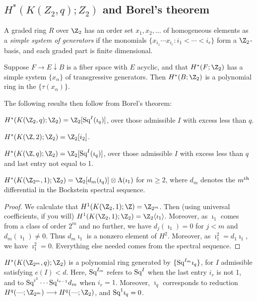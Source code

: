 \documentclass[11pt]{article}
\begin{document}
{\subsection{\texorpdfstring{$H^*(K(Z_2,q);Z_2)$}{H*(K(Z/2,q);Z/2)} and Borel's theorem}
A graded ring $R$ over $\Z_2$ has an order set $x_1,x_2,\ldots$ of homogeneous elements as a \emph{simple system of generators} if the monomials $\{x_{i_1}\cdots x_{i_r}:i_1<\cdots<i_r\}$ form a $\Z_2$-basis, and each graded part is finite dimensional.
\begin{thm*}
Suppose $F\rightarrow E\downarrow B$ is a fiber space with $E$ acyclic, and that $H^*(F;\Z_2)$ has a simple system $\{x_\alpha\}$ of transgressive generators. Then $H^*(B;\Z_2)$ is a polynomial ring in the $\{\tau(x_\alpha)\}$.
\end{thm*}
The following results then follow from Borel's theorem:
\begin{thm*}
$H^*(K(\Z_2,q);\Z_2)=\Z_2[\Squ^I(\imath_q)]$, over those admissible $I$ with excess less than $q$.
\end{thm*}
\begin{prop*}
$H^*(K(\Z,2);\Z_2)=\Z_2[i_2]$.
\end{prop*}
\begin{thm*}$H^*(K(\Z,q);\Z_2)=\Z_2[\Squ^I(\imath_q)]$, over those admissible $I$ with excess less than $q$ and last entry not equal to 1.
\end{thm*}
\begin{prop*}$H^*(K(\Z_{2^m},1);\Z_2)=\Z_2[d_m(\imath_q)]\otimes \Lambda(\imath_1)$ for $m\geq2$, where $d_m$ denotes the $m^\textup{th}$ differential in the Bockstein spectral sequence.
\end{prop*}
\begin{proof}
We calculate that $H^1(K(\Z_2,1);\Z)=\Z_{2^m}$. Then (using universal coefficients, if you will) $H^1(K(\Z_2,1);\Z_2)=\Z_{2}\langle\imath_1\rangle$. Moreover, as $\imath_1$ comes from a class of order $2^m$ and no further, we have $d_j(\imath_1)=0$ for $j<m$ and $d_m(\imath_1)\neq0$. Thus $d_m\imath_1$ is a nonzero element of $H^2$. Moreover, as $\imath_1^2=d_1\imath_1$, we have $\imath_1^2=0$. Everything else needed comes from the spectral sequence.
\end{proof}
\begin{thm*}
$H^*(K(\Z_{2^m},q);\Z_2)$ is a polynomial ring generated by
$\{\textup{Sq}^{I_m}\imath_q\}$, for $I$ admissible satisfying $e(I)<d$. Here,
$\textup{Sq}^{I_m}$ refers to $\textup{Sq}^I$ when the last entry $i_r$ is not 1, and to
$\textup{Sq}^{i^1}\cdots \textup{Sq}^{i_{r-1}}d_m$ when $i_r=1$. Moreover, $\imath_q$ corresponds
to reduction $H^q(\DASH;\Z_{2^m})\to H^q(\DASH;\Z_{2})$, and $\textup{Sq}^1\imath_q=0$.
\end{thm*}
}
\end{document}
